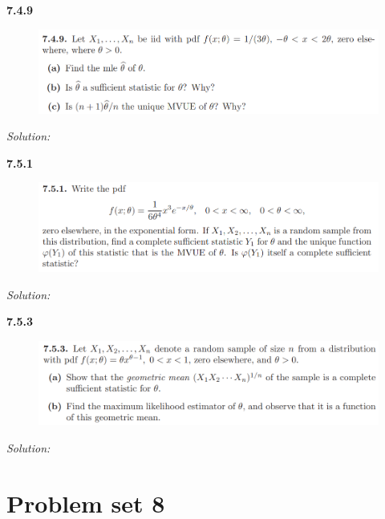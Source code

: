 \documentclass{book}
\theoremstyle{definition}
\begin{document}
\noindent\textbf{7.4.9}
\begin{figure}[!htb]
	\centering
	\includegraphics[scale=1]{749}
\end{figure}



\noindent \textit{Solution:} 
\newpage






\noindent\textbf{7.5.1}
\begin{figure}[!htb]
	\centering
	\includegraphics[scale=1]{751}
\end{figure}



\noindent \textit{Solution:}



\newpage





\noindent\textbf{7.5.3}
\begin{figure}[!htb]
	\centering
	\includegraphics[scale=1]{753}
\end{figure}
\noindent \textit{Solution:}
\newpage






\section{Problem set 8}




\newpage

	
	
\end{document}
